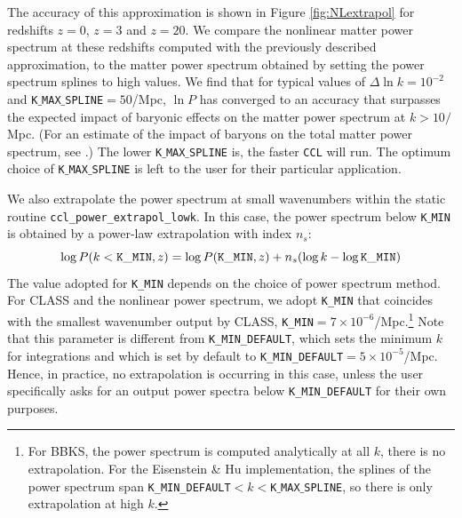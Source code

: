 \documentclass[\docopts]{\docclass}
\newcommand{\ccl}{{\tt CCL}\xspace}
\begin{document}
The accuracy of this approximation is shown in Figure \ref{fig:NLextrapol} for redshifts $z=0$, $z=3$ and $z=20$. We compare the nonlinear matter power spectrum at these redshifts computed with the previously described approximation, to the matter power spectrum obtained by setting the power spectrum splines to high values. We find that for typical values of $\Delta \ln k=10^{-2}$ and {\tt K$\_$MAX$\_$SPLINE}$=50$/Mpc, $\ln P$ has converged to an accuracy that surpasses the expected impact of baryonic effects on the matter power spectrum at $k>10/$Mpc.  (For an estimate of the impact of baryons on the total matter power spectrum, see \citealt{Schneider15}.) The lower {\tt K$\_$MAX$\_$SPLINE} is, the faster \ccl will run. The optimum choice of {\tt K$\_$MAX$\_$SPLINE} is left to the user for their particular application.

We also extrapolate the power spectrum at small wavenumbers within the static routine {\tt ccl\_power\_extrapol\_lowk}. In this case, the power spectrum below {\tt K$\_$MIN} is obtained by a power-law extrapolation with index $n_s$:
\begin{equation}
  \log P(k<{\tt K\_MIN},z) = \log P({\tt K\_MIN},z) + n_s (\log k-\log{\tt K\_MIN})
\end{equation}
The value adopted for {\tt K\_MIN} depends on the choice of power spectrum method. For CLASS and the nonlinear power spectrum, we adopt {\tt K\_MIN} that coincides with the smallest wavenumber output by CLASS, {\tt K\_MIN}$=7\times 10^{-6}$/Mpc.\footnote{For BBKS, the power spectrum is computed analytically at all $k$, there is no extrapolation. For the Eisenstein \& Hu implementation, the splines of the power spectrum span {\tt K\_MIN\_DEFAULT}$<k<${\tt K$\_$MAX$\_$SPLINE}, so there is only extrapolation at high $k$.} Note that this parameter is different from {\tt K\_MIN\_DEFAULT}, which sets the minimum $k$ for integrations and which is set by default to {\tt K\_MIN\_DEFAULT}$=5\times 10^{-5}$/Mpc. Hence, in practice, no extrapolation is occurring in this case, unless the user specifically asks for an output power spectra below {\tt K\_MIN\_DEFAULT} for their own purposes.
\end{document}
